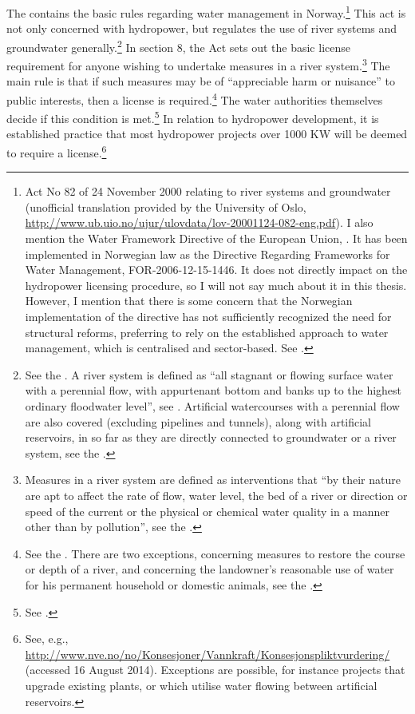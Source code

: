 The \cite{wra00} contains the basic rules regarding water management in Norway.\footnote{Act No 82 of 24 November 2000 relating to river systems and groundwater (unofficial translation provided by the University of Oslo, \url{http://www.ub.uio.no/ujur/ulovdata/lov-20001124-082-eng.pdf}). I also mention the Water Framework Directive of the European Union, \cite{water00}. It has been implemented in Norwegian law as the Directive Regarding Frameworks for Water Management, FOR-2006-12-15-1446. It does not directly impact on the hydropower licensing procedure, so I will not say much about it in this thesis. However, I mention that there is some concern that the Norwegian implementation of the directive has not sufficiently recognized the need for structural reforms, preferring to rely on the established approach to water management, which is centralised and sector-based. See \cite{hanssen14}.} This act is not only concerned with hydropower, but regulates the use of river systems and groundwater generally.\footnote{See the \cite[1]{wra00}. A river system is defined as ``all stagnant or flowing surface water with a perennial flow, with appurtenant bottom and banks up to the highest ordinary floodwater level'', see \cite[2]{wra00}. Artificial watercourses with a perennial flow are also covered (excluding pipelines and tunnels), along with artificial reservoirs, in so far as they are directly connected to groundwater or a river system, see the \cite[2a-2b]{wra00}.} In section 8, the Act sets out the basic license requirement for anyone wishing to undertake measures in a river system.\footnote{Measures in a river system are defined as interventions that ``by their nature are apt to affect the rate of flow, water level, the bed of a river or direction or speed of the current or the physical or chemical water quality in a manner other than by pollution'', see the \cite[3a]{wra00}.} The main rule is that if such measures may be of ``appreciable harm or nuisance''  to public interests, then a license is required.\footnote{See the \cite[8]{wra00}. There are two exceptions, concerning measures to restore the course or depth of a river, and concerning the landowner's reasonable use of water for his permanent household or domestic animals, see the \cite[12|15]{wra00}.} The water authorities themselves decide if this condition is met.\footnote{See \cite[18]{wra00}.} In relation to hydropower development, it is established practice that most hydropower projects over 1000 KW will be deemed to require a license.\footnote{See, e.g., \url{http://www.nve.no/no/Konsesjoner/Vannkraft/Konsesjonspliktvurdering/} (accessed 16 August 2014). Exceptions are possible, for instance projects that upgrade existing plants, or which utilise water flowing between artificial reservoirs.}

